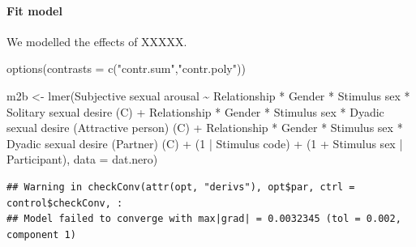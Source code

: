 \documentclass[
  bookmarksnumbered]{article}
\newenvironment{Shaded}{\begin{snugshade}}{\end{snugshade}}
\newcommand{\AttributeTok}[1]{\textcolor[rgb]{0.80,0.80,0.80}{#1}}
\newcommand{\DecValTok}[1]{\textcolor[rgb]{0.86,0.86,0.80}{#1}}
\newcommand{\FunctionTok}[1]{\textcolor[rgb]{0.94,0.94,0.56}{#1}}
\newcommand{\NormalTok}[1]{\textcolor[rgb]{0.80,0.80,0.80}{#1}}
\newcommand{\OtherTok}[1]{\textcolor[rgb]{0.94,0.94,0.56}{#1}}
\newcommand{\SpecialCharTok}[1]{\textcolor[rgb]{0.86,0.64,0.64}{#1}}
\newcommand{\StringTok}[1]{\textcolor[rgb]{0.80,0.58,0.58}{#1}}
\begin{document}
\hypertarget{fit-model-2}{%
\paragraph{Fit model}\label{fit-model-2}}

We modelled the effects of XXXXX.

\begin{Shaded}
\begin{Highlighting}[]
\FunctionTok{options}\NormalTok{(}\AttributeTok{contrasts =} \FunctionTok{c}\NormalTok{(}\StringTok{"contr.sum"}\NormalTok{,}\StringTok{"contr.poly"}\NormalTok{))}

\NormalTok{m2b }\OtherTok{\textless{}{-}} \FunctionTok{lmer}\NormalTok{(}\StringTok{\textasciigrave{}}\AttributeTok{Subjective sexual arousal}\StringTok{\textasciigrave{}} \SpecialCharTok{\textasciitilde{}}
\NormalTok{            Relationship }\SpecialCharTok{*}\NormalTok{ Gender }\SpecialCharTok{*} \StringTok{\textasciigrave{}}\AttributeTok{Stimulus sex}\StringTok{\textasciigrave{}} \SpecialCharTok{*} \StringTok{\textasciigrave{}}\AttributeTok{Solitary sexual desire (C)}\StringTok{\textasciigrave{}} \SpecialCharTok{+}
\NormalTok{            Relationship }\SpecialCharTok{*}\NormalTok{ Gender }\SpecialCharTok{*} \StringTok{\textasciigrave{}}\AttributeTok{Stimulus sex}\StringTok{\textasciigrave{}} \SpecialCharTok{*} \StringTok{\textasciigrave{}}\AttributeTok{Dyadic sexual desire (Attractive person) (C)}\StringTok{\textasciigrave{}} \SpecialCharTok{+}
\NormalTok{            Relationship }\SpecialCharTok{*}\NormalTok{ Gender }\SpecialCharTok{*} \StringTok{\textasciigrave{}}\AttributeTok{Stimulus sex}\StringTok{\textasciigrave{}} \SpecialCharTok{*} \StringTok{\textasciigrave{}}\AttributeTok{Dyadic sexual desire (Partner) (C)}\StringTok{\textasciigrave{}} \SpecialCharTok{+}
\NormalTok{            (}\DecValTok{1} \SpecialCharTok{|} \StringTok{\textasciigrave{}}\AttributeTok{Stimulus code}\StringTok{\textasciigrave{}}\NormalTok{) }\SpecialCharTok{+}
\NormalTok{            (}\DecValTok{1} \SpecialCharTok{+} \StringTok{\textasciigrave{}}\AttributeTok{Stimulus sex}\StringTok{\textasciigrave{}} \SpecialCharTok{|}\NormalTok{ Participant),}
           \AttributeTok{data =}\NormalTok{ dat.nero)}
\end{Highlighting}
\end{Shaded}

\begin{verbatim}
## Warning in checkConv(attr(opt, "derivs"), opt$par, ctrl = control$checkConv, :
## Model failed to converge with max|grad| = 0.0032345 (tol = 0.002, component 1)
\end{verbatim}
\end{document}
